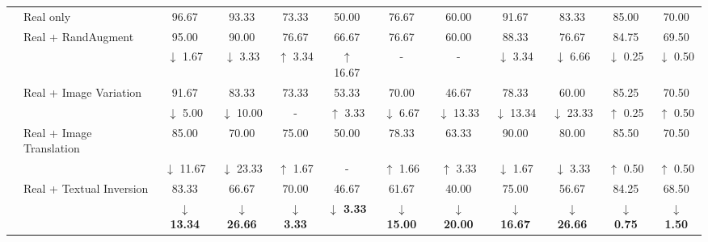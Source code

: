 \begin{table}[!t]
{\begin{tabular}{clcccccccccc}
 \midrule
 & Real only & 96.67 & 93.33 & 73.33 & 50.00 & 76.67 & 60.00 & 91.67 & 83.33 & 85.00 & 70.00\\
 & Real + RandAugment & 95.00 & 90.00  & 76.67 & 66.67  & 76.67 & 60.00 & 88.33  & 76.67  & 84.75 & 69.50 \\
 &  \citep{cubuk2020randaugment} &  {\scriptsize \color{red}$\downarrow$ 1.67} & {\scriptsize \color{red}$\downarrow$ 3.33} &  {\scriptsize \color{ForestGreen}$\uparrow$ 3.34} & {\scriptsize \color{ForestGreen}$\uparrow$ 16.67} & - & - & {\scriptsize \color{red}$\downarrow$ 3.34} & {\scriptsize \color{red}$\downarrow$ 6.66} & {\scriptsize \color{red}$\downarrow$ 0.25} & {\scriptsize \color{red}$\downarrow$ 0.50} \\
 & Real + Image Variation & 91.67  & 83.33  & 73.33 & 53.33  & 70.00  & 46.67  & 78.33  & 60.00  & 85.25 & 70.50 \\
 &  \citep{xu2023versatile} & {\scriptsize \color{red}$\downarrow$ 5.00} & {\scriptsize \color{red}$\downarrow$ 10.00} & - & {\scriptsize \color{ForestGreen}$\uparrow$ 3.33} & {\scriptsize \color{red}$\downarrow$ 6.67} & {\scriptsize \color{red}$\downarrow$ 13.33} & {\scriptsize \color{red}$\downarrow$ 13.34} & {\scriptsize \color{red}$\downarrow$ 23.33} & {\scriptsize \color{ForestGreen}$\uparrow$ 0.25} & {\scriptsize \color{ForestGreen}$\uparrow$ 0.50} \\
 & Real + Image Translation & 85.00 & 70.00  & 75.00  & 50.00 & 78.33  & 63.33  & 90.00 & 80.00  & 85.50 & 70.50 \\
 &  \citep{pan2023boomerang} & {\scriptsize \color{red}$\downarrow$ 11.67}  & {\scriptsize \color{red}$\downarrow$ 23.33} & {\scriptsize \color{ForestGreen}$\uparrow$ 1.67} & - & {\scriptsize \color{ForestGreen}$\uparrow$ 1.66} & {\scriptsize \color{ForestGreen}$\uparrow$ 3.33} &  {\scriptsize \color{red}$\downarrow$ 1.67} & {\scriptsize \color{red}$\downarrow$ 3.33} & {\scriptsize \color{ForestGreen}$\uparrow$ 0.50} & {\scriptsize \color{ForestGreen}$\uparrow$ 0.50} \\
& Real + Textual Inversion & 83.33 & 66.67 & 70.00 & 46.67 & 61.67 & 40.00 & 75.00 & 56.67 & 84.25 & 68.50 \\
&  \citep{gal2022image} & {\scriptsize \color{red}\textbf{$\downarrow$ 13.34}} & {\scriptsize \color{red}\textbf{$\downarrow$ 26.66}} & {\scriptsize \color{red}\textbf{$\downarrow$ 3.33}} & {\scriptsize \color{red}\textbf{$\downarrow$ 3.33}} & {\scriptsize \color{red}\textbf{$\downarrow$ 15.00}} & {\scriptsize \color{red}\textbf{$\downarrow$ 20.00}} & {\scriptsize \color{red}\textbf{$\downarrow$ 16.67}} & {\scriptsize \color{red}\textbf{$\downarrow$ 26.66}} & {\scriptsize \color{red}\textbf{$\downarrow$ 0.75}} & {\scriptsize \color{red}\textbf{$\downarrow$ 1.50}}\\

\end{tabular}}
\end{table}
